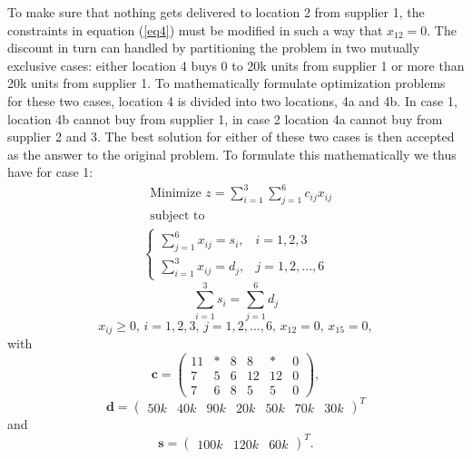 \documentclass{article}
\begin{document}
  \noindent
  To make sure that nothing gets delivered to location 2 from supplier 1, the constraints in equation (\ref{eq4}) must be modified in such a way that $x_{12} = 0$. The discount in turn can handled by partitioning the problem in two mutually exclusive cases: either location 4 buys 0 to 20k units from supplier 1 or more than 20k units from supplier 1. To mathematically formulate optimization problems for these two cases, location 4 is divided into two locations, 4a and 4b. In case 1, location 4b cannot buy from supplier 1, in case 2 location 4a cannot buy from supplier 2 and 3. The best solution for either of these two cases is then accepted as the answer to the original problem. To formulate this mathematically we thus have for case 1:
  \begin{align*}
  & \text{Minimize } z = \sum_{i=1}^{3}\sum_{j=1}^6 c_{ij}x_{ij} \\
  & \text{subject to}
    \label{eq10}
  \end{align*}
  \begin{align*}
    \begin{cases}
      \sum_{j=1}^{6} x_{ij} = s_{i}, & i = 1, 2, 3 \\
      \sum_{i=1}^{3} x_{ij} = d_{j}, & j = 1, 2, ..., 6
    \end{cases}
  \end{align*}
  \begin{equation*}
    \sum_{i=1}^{3} s_{i} = \sum_{j=1}^6 d_{j}
    \label{eq12}
  \end{equation*}
  \begin{equation*}
    x_{ij} \geq 0,\, i = 1, 2, 3,\, j = 1, 2, ..., 6,\, x_{12} = 0,\, x_{15} = 0,
    \label{eq13}
  \end{equation*}
  with
  \begin{equation*}
    \mathbf{c} = 
    \begin{pmatrix}
      11 & * & 8 & 8  & *  & 0\\
      7  & 5 & 6 & 12 & 12 & 0\\
      7  & 6 & 8 & 5  & 5  & 0
    \end{pmatrix},
    \label{eq14}
  \end{equation*}
  \begin{equation*}
    \mathbf{d} =
    \begin{pmatrix}
      50k & 40k & 90k & 20k & 50k & 70k & 30k
    \end{pmatrix}^T
    \label{eq15}
  \end{equation*}
  and
  \begin{equation*}
    \mathbf{s} =
    \begin{pmatrix}
      100k & 120k & 60k
    \end{pmatrix}^T.
    \label{eq16}
  \end{equation*}
\end{document}
